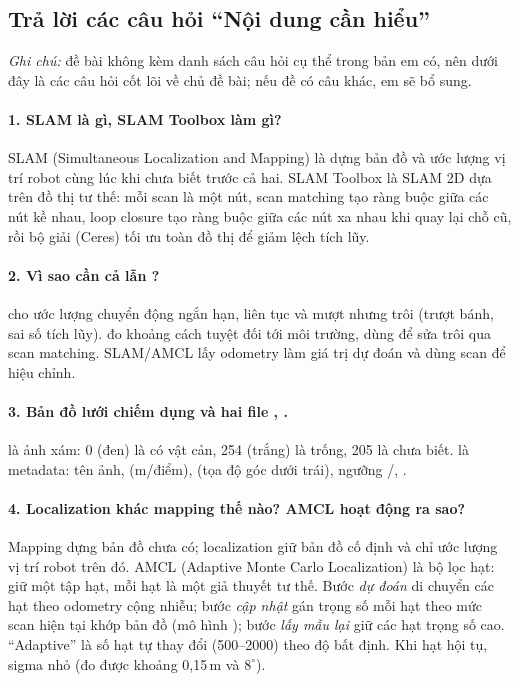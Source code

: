 \subsection{Trả lời các câu hỏi ``Nội dung cần hiểu''}
\emph{Ghi chú:} đề bài không kèm danh sách câu hỏi cụ thể trong bản em có, nên dưới đây là các câu hỏi cốt lõi về chủ đề bài;
nếu đề có câu khác, em sẽ bổ sung.

\paragraph{1. SLAM là gì, SLAM Toolbox làm gì?} SLAM (Simultaneous Localization and Mapping) là dựng bản đồ và ước lượng vị trí robot cùng lúc khi chưa biết trước cả hai.
SLAM Toolbox là SLAM 2D dựa trên đồ thị tư thế: mỗi scan là một nút, scan matching tạo ràng buộc giữa các nút kề nhau, loop closure tạo ràng buộc giữa các nút xa nhau khi quay lại chỗ cũ, rồi bộ giải (Ceres) tối ưu toàn đồ thị để giảm lệch tích lũy.

\paragraph{2. Vì sao cần cả  lẫn ?}  cho ước lượng chuyển động ngắn hạn, liên tục và mượt nhưng trôi (trượt bánh, sai số tích lũy).  đo khoảng cách tuyệt đối tới môi trường, dùng để sửa trôi qua scan matching. SLAM/AMCL lấy odometry làm giá trị dự đoán và dùng scan để hiệu chỉnh.

\paragraph{3. Bản đồ lưới chiếm dụng và hai file , .}  là ảnh xám: 0 (đen) là có vật cản, 254 (trắng) là trống, 205 là chưa biết.  là metadata: tên ảnh,  (m/điểm),  (tọa độ góc dưới trái), ngưỡng /, .

\paragraph{4. Localization khác mapping thế nào? AMCL hoạt động ra sao?} Mapping dựng bản đồ chưa có; localization giữ bản đồ cố định và chỉ ước lượng vị trí robot trên đó.
AMCL (Adaptive Monte Carlo Localization) là bộ lọc hạt: giữ một tập hạt, mỗi hạt là một giả thuyết tư thế. Bước \emph{dự đoán} di chuyển các hạt theo odometry cộng nhiễu;
bước \emph{cập nhật} gán trọng số mỗi hạt theo mức scan hiện tại khớp bản đồ (mô hình ); bước \emph{lấy mẫu lại} giữ các hạt trọng số cao.
``Adaptive'' là số hạt tự thay đổi (500--2000) theo độ bất định. Khi hạt hội tụ, sigma nhỏ (đo được khoảng 0,15\,m và $8^\circ$).

